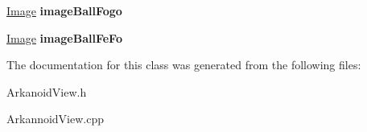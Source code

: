 \begin{DoxyCompactItemize}
\item 
\hypertarget{class_arkanoid_view_a60f92d77207213bb548c44fc3f1b5861}{\hyperlink{class_image}{\-Image} {\bfseries image\-Ball\-Fogo}}\label{class_arkanoid_view_a60f92d77207213bb548c44fc3f1b5861}

\item 
\hypertarget{class_arkanoid_view_af464286682b93aeefe86b344150e4e33}{\hyperlink{class_image}{\-Image} {\bfseries image\-Ball\-Fe\-Fo}}\label{class_arkanoid_view_af464286682b93aeefe86b344150e4e33}

\end{DoxyCompactItemize}


\-The documentation for this class was generated from the following files\-:\begin{DoxyCompactItemize}
\item 
\-Arkanoid\-View.\-h\item 
\-Arkannoid\-View.\-cpp\end{DoxyCompactItemize}
